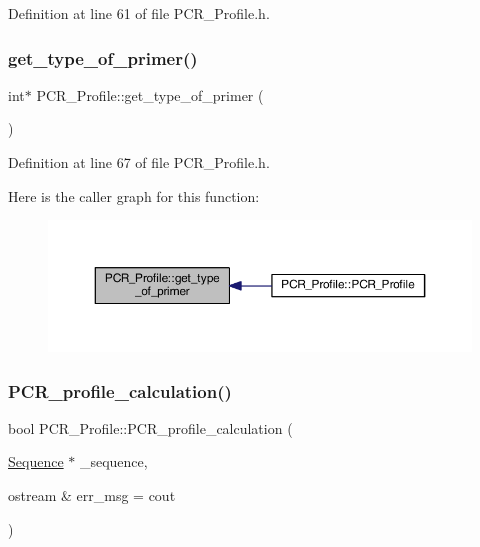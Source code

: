 Definition at line 61 of file P\+C\+R\+\_\+\+Profile.\+h.

\mbox{\label{class_p_c_r___profile_a6243b3536533df498c781f9e592a86db}} 
\subsubsection{\texorpdfstring{get\+\_\+type\+\_\+of\+\_\+primer()}{get\_type\_of\_primer()}}
{\footnotesize\ttfamily int$\ast$ P\+C\+R\+\_\+\+Profile\+::get\+\_\+type\+\_\+of\+\_\+primer (\begin{DoxyParamCaption}{ }\end{DoxyParamCaption})\hspace{0.3cm}{\ttfamily [inline]}}



Definition at line 67 of file P\+C\+R\+\_\+\+Profile.\+h.

Here is the caller graph for this function\+:
\nopagebreak
\begin{figure}[H]
\begin{center}
\leavevmode
\includegraphics[width=350pt]{class_p_c_r___profile_a6243b3536533df498c781f9e592a86db_icgraph}
\end{center}
\end{figure}
\mbox{\label{class_p_c_r___profile_a339a01da69e5e709f6b33678bd9f73dc}} 
\subsubsection{\texorpdfstring{P\+C\+R\+\_\+profile\+\_\+calculation()}{PCR\_profile\_calculation()}}
{\footnotesize\ttfamily bool P\+C\+R\+\_\+\+Profile\+::\+P\+C\+R\+\_\+profile\+\_\+calculation (\begin{DoxyParamCaption}\item[{\mbox{\hyperlink{class_sequence}{Sequence}} $\ast$}]{\+\_\+sequence,  }\item[{ostream \&}]{err\+\_\+msg = {\ttfamily cout} }\end{DoxyParamCaption})}



